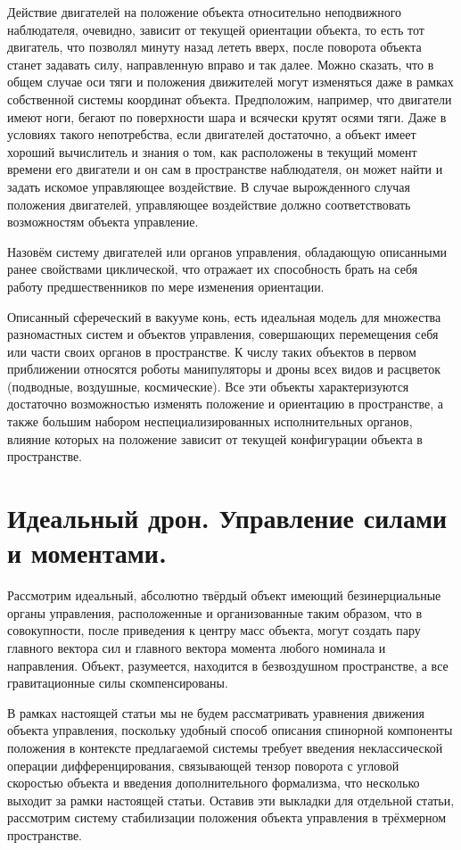 \documentclass[a4paper]{article}
\begin{document}
Действие двигателей на положение объекта относительно неподвижного наблюдателя, очевидно, зависит от текущей ориентации объекта, то есть тот двигатель, что позволял минуту назад лететь вверх, после поворота объекта станет задавать силу, направленную вправо и так далее. Можно сказать, что в общем случае оси тяги и положения движителей могут изменяться даже в рамках собственной системы координат объекта. Предположим, например, что двигатели имеют ноги, бегают по поверхности шара и всячески крутят осями тяги. Даже в условиях такого непотребства, если двигателей достаточно, а объект имеет хороший вычислитель и знания о том, как расположены в текущий момент времени его двигатели и он сам в пространстве наблюдателя, он может найти и задать искомое управляющее воздействие. В случае вырожденного случая положения двигателей, управляющее воздействие должно соответствовать возможностям объекта управление. 

Назовём систему двигателей или органов управления, обладающую описанными ранее свойствами циклической, что отражает их способность брать на себя работу предшественников по мере изменения ориентации.

Описанный сфереческий в вакууме конь, есть идеальная модель для множества разномастных систем и объектов управления, совершающих перемещения себя или части своих органов в пространстве. К числу таких объектов в первом приближении относятся роботы манипуляторы и дроны всех видов и расцветок (подводные, воздушные, космические). Все эти объекты характеризуются достаточно возможностью изменять положение и ориентацию в пространстве, а также большим набором неспециализированных исполнительных органов, влияние которых на положение зависит от текущей конфигурации объекта в пространстве.

\section{Идеальный дрон. Управление силами и моментами.}
Рассмотрим идеальный, абсолютно твёрдый объект имеющий безинерциальные органы управления, расположенные и организованные таким образом, что в совокупности, после приведения к центру масс объекта, могут создать пару главного вектора сил и главного вектора момента любого номинала и направления. Объект, разумеется, находится в безвоздушном пространстве, а все гравитационные силы скомпенсированы.

В рамках настоящей статьи мы не будем рассматривать уравнения движения объекта управления, поскольку удобный способ описания спинорной компоненты положения в контексте предлагаемой системы требует введения неклассической операции дифференцирования, связывающей тензор поворота с угловой скоростью объекта и введения дополнительного формализма, что несколько выходит за рамки настоящей статьи. Оставив эти выкладки для отдельной статьи, рассмотрим систему стабилизации положения объекта управления в трёхмерном пространстве.
\end{document}
